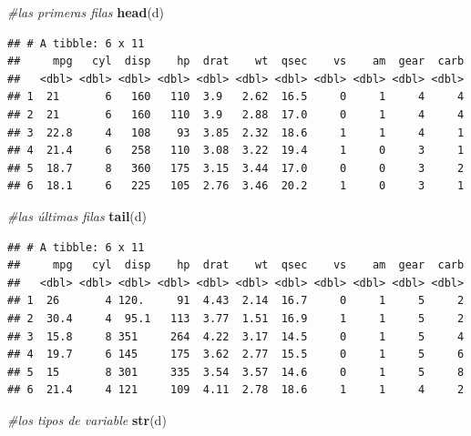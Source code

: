 \documentclass[
]{article}
\newenvironment{Shaded}{\begin{snugshade}}{\end{snugshade}}
\newcommand{\CommentTok}[1]{\textcolor[rgb]{0.56,0.35,0.01}{\textit{#1}}}
\newcommand{\FunctionTok}[1]{\textcolor[rgb]{0.13,0.29,0.53}{\textbf{#1}}}
\newcommand{\NormalTok}[1]{#1}
\begin{document}
\begin{Shaded}
\begin{Highlighting}[]
\CommentTok{\#las primeras filas}
\FunctionTok{head}\NormalTok{(d)}
\end{Highlighting}
\end{Shaded}

\begin{verbatim}
## # A tibble: 6 x 11
##     mpg   cyl  disp    hp  drat    wt  qsec    vs    am  gear  carb
##   <dbl> <dbl> <dbl> <dbl> <dbl> <dbl> <dbl> <dbl> <dbl> <dbl> <dbl>
## 1  21       6   160   110  3.9   2.62  16.5     0     1     4     4
## 2  21       6   160   110  3.9   2.88  17.0     0     1     4     4
## 3  22.8     4   108    93  3.85  2.32  18.6     1     1     4     1
## 4  21.4     6   258   110  3.08  3.22  19.4     1     0     3     1
## 5  18.7     8   360   175  3.15  3.44  17.0     0     0     3     2
## 6  18.1     6   225   105  2.76  3.46  20.2     1     0     3     1
\end{verbatim}

\begin{Shaded}
\begin{Highlighting}[]
\CommentTok{\#las últimas filas}
\FunctionTok{tail}\NormalTok{(d)}
\end{Highlighting}
\end{Shaded}

\begin{verbatim}
## # A tibble: 6 x 11
##     mpg   cyl  disp    hp  drat    wt  qsec    vs    am  gear  carb
##   <dbl> <dbl> <dbl> <dbl> <dbl> <dbl> <dbl> <dbl> <dbl> <dbl> <dbl>
## 1  26       4 120.     91  4.43  2.14  16.7     0     1     5     2
## 2  30.4     4  95.1   113  3.77  1.51  16.9     1     1     5     2
## 3  15.8     8 351     264  4.22  3.17  14.5     0     1     5     4
## 4  19.7     6 145     175  3.62  2.77  15.5     0     1     5     6
## 5  15       8 301     335  3.54  3.57  14.6     0     1     5     8
## 6  21.4     4 121     109  4.11  2.78  18.6     1     1     4     2
\end{verbatim}

\begin{Shaded}
\begin{Highlighting}[]
\CommentTok{\#los tipos de variable}
\FunctionTok{str}\NormalTok{(d)}
\end{Highlighting}
\end{Shaded}
\end{document}
